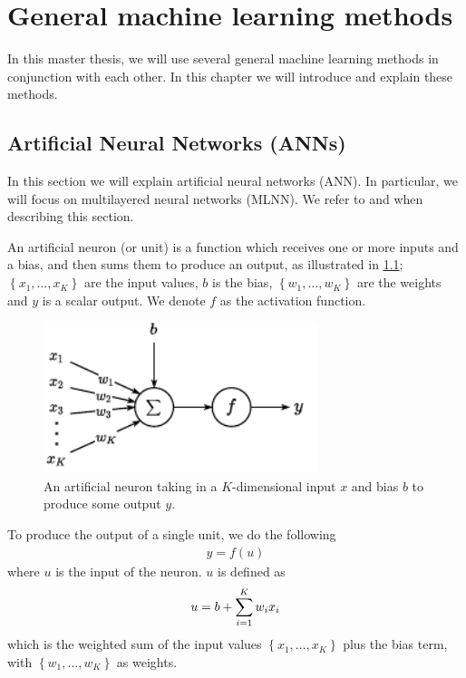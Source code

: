 \chapter{General machine learning methods}
In this master thesis, we will use several general machine learning methods in conjunction with each other. In this chapter we will introduce and explain these methods.

\section{Artificial Neural Networks (ANNs)}
In this section we will explain artificial neural networks (ANN). In particular, we will focus on multilayered neural networks (MLNN). We refer to \cite[Chapter 1]{Aggarwal18} and \cite{rong2016word2vec} when describing this section.

\begin{definition}
An artificial neuron (or unit) is a function which receives one or more inputs and a bias, and then sums them to produce an output, as illustrated in \cref{fig:artificial_neuron}; $\left\{ x_1, \ldots, x_K \right\}$ are the input values, $b$ is the bias, $\left\{ w_1, \ldots, w_K \right\}$ are the weights and $y$ is a scalar output. We denote $f$ as the activation function.
\end{definition}

\begin{figure}[H]
    \centering
    \includegraphics[width=8cm]{thesis/figures/artificial-neuron_cropped.pdf}
    \caption{An artificial neuron taking in a $K$-dimensional input $x$ and bias $b$ to produce some output $y$.}
    \label{fig:artificial_neuron}
\end{figure}

To produce the output of a single unit, we do the following
\begin{align}
    y = f(u)
\end{align}
where $u$ is the input of the neuron. $u$ is defined as
\begin{align}
    u = b + \sum\limits_{i=1}^{K} w_i x_i
\end{align}
which is the weighted sum of the input values $\left\{ x_1, \ldots, x_K \right\}$ plus the bias term, with $\left\{ w_1, \ldots, w_K \right\}$ as weights.


